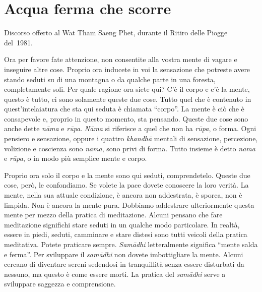 \chapter{Acqua ferma che scorre}

\begin{openingQuote}
  \centering

  Discorso offerto al Wat Tham Saeng Phet, durante il Ritiro delle Piogge
  del~1981.
\end{openingQuote}

Ora per favore fate attenzione, non consentite alla vostra mente di
vagare e inseguire altre cose. Proprio ora inducete in voi la sensazione
che potreste avere stando seduti su di una montagna o da qualche parte
in una foresta, completamente soli. Per quale ragione ora siete qui? C'è
il corpo e c'è la mente, questo è tutto, ci sono solamente queste due
cose. Tutto quel che è contenuto in quest'intelaiatura che sta qui
seduta è chiamata ``corpo''. La mente è ciò che è consapevole e, proprio
in questo momento, sta pensando. Queste due cose sono anche dette
\emph{nāma} e \emph{rūpa}. \emph{Nāma} si riferisce a quel che non ha
\emph{rūpa}, o forma. Ogni pensiero e sensazione, oppure i quattro
\emph{khandhā} mentali di sensazione, percezione, volizione e coscienza
sono \emph{nāma}, sono privi di forma. Tutto insieme è detto \emph{nāma}
e \emph{rūpa}, o in modo più semplice mente e corpo.

Proprio ora solo il corpo e la mente sono qui seduti, comprendetelo.
Queste due cose, però, le confondiamo. Se volete la pace dovete
conoscere la loro verità. La mente, nella sua attuale condizione, è
ancora non addestrata, è sporca, non è limpida. Non è ancora la mente
pura. Dobbiamo addestrare ulteriormente questa mente per mezzo della
pratica di meditazione. Alcuni pensano che fare meditazione significhi
stare seduti in un qualche modo particolare. In realtà, essere in piedi,
seduti, camminare e stare distesi sono tutti veicoli della pratica
meditativa. Potete praticare sempre. \emph{Samādhi} letteralmente
significa ``mente salda e ferma''. Per sviluppare il \emph{samādhi} non
dovete imbottigliare la mente. Alcuni cercano di diventare sereni
sedendosi in tranquillità senza essere disturbati da nessuno, ma questo
è come essere morti. La pratica del \emph{samādhi} serve a sviluppare
saggezza e comprensione.

